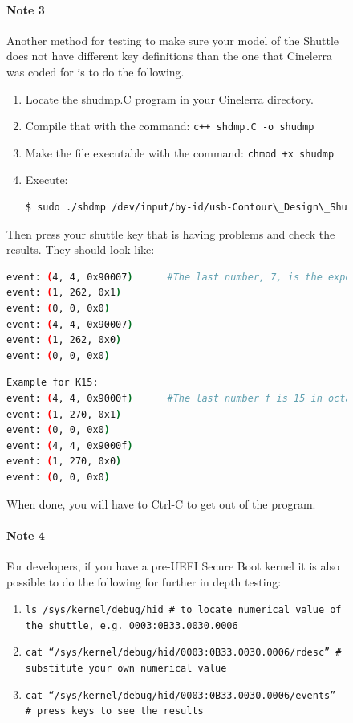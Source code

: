 \begin{figure}
\paragraph{Note 3}
Another method for testing to make sure your model of the Shuttle does not have different key definitions than the one that Cinelerra was coded for is to do the following.

\begin{enumerate}
    \item Locate the shudmp.C program in your Cinelerra directory.
    \item Compile that with the command:  \texttt{c++ shdmp.C -o shudmp}
    \item Make the file executable with the command:  \texttt{chmod +x shudmp}
    \item Execute:
    \begin{lstlisting}[language=Bash]
$ sudo ./shdmp /dev/input/by-id/usb-Contour\_Design\_ShuttlePro-event-if00 # substitute your shuttle
    \end{lstlisting}
\end{enumerate}

\noindent Then press your shuttle key that is having problems and check the results.  They should look like:

    \begin{lstlisting}[language=Bash, caption={Example for K7}]
event: (4, 4, 0x90007)		#The last number, 7, is the expected Key number. 
event: (1, 262, 0x1) 
event: (0, 0, 0x0) 
event: (4, 4, 0x90007) 
event: (1, 262, 0x0) 
event: (0, 0, 0x0) 
\end{lstlisting}
    \begin{lstlisting}[language=Bash, caption={Example for K15}]
Example for K15: 
event: (4, 4, 0x9000f)		#The last number f is 15 in octal and is the expected Key. 
event: (1, 270, 0x1) 
event: (0, 0, 0x0) 
event: (4, 4, 0x9000f) 
event: (1, 270, 0x0) 
event: (0, 0, 0x0)
\end{lstlisting}

\noindent When done, you will have to Ctrl-C to get out of the program.

\paragraph{Note 4} For developers, if you have a pre-UEFI Secure Boot kernel it is also possible to do the following for further in depth testing:

\begin{enumerate}
    \item \texttt{ls /sys/kernel/debug/hid   \# to locate numerical value of the shuttle, e.g. 0003:0B33.0030.0006}
    \item \texttt{cat “/sys/kernel/debug/hid/0003:0B33.0030.0006/rdesc”    \# substitute your own numerical value}
    \item \texttt{cat “/sys/kernel/debug/hid/0003:0B33.0030.0006/events”  \# press keys to see the results}
\end{enumerate}


\end{figure}
